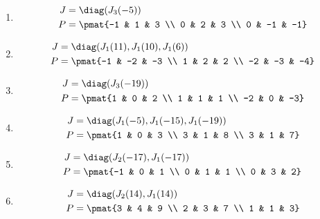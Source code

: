 \begin{enumerate}
\item

\begin{align*}
J &= \diag(J_{3}(-5))\\
P &= \pmat{-1 & 1 & 3 \\ 0 & 2 & 3 \\ 0 & -1 & -1}
\end{align*}

\item

\begin{align*}
J &= \diag(J_{1}(11), J_{1}(10), J_{1}(6))\\
P &= \pmat{-1 & -2 & -3 \\ 1 & 2 & 2 \\ -2 & -3 & -4}
\end{align*}

\item

\begin{align*}
J &= \diag(J_{3}(-19))\\
P &= \pmat{1 & 0 & 2 \\ 1 & 1 & 1 \\ -2 & 0 & -3}
\end{align*}

\item

\begin{align*}
J &= \diag(J_{1}(-5), J_{1}(-15), J_{1}(-19))\\
P &= \pmat{1 & 0 & 3 \\ 3 & 1 & 8 \\ 3 & 1 & 7}
\end{align*}

\item

\begin{align*}
J &= \diag(J_{2}(-17), J_{1}(-17))\\
P &= \pmat{-1 & 0 & 1 \\ 0 & 1 & 1 \\ 0 & 3 & 2}
\end{align*}

\item

\begin{align*}
J &= \diag(J_{2}(14), J_{1}(14))\\
P &= \pmat{3 & 4 & 9 \\ 2 & 3 & 7 \\ 1 & 1 & 3}
\end{align*}


\end{enumerate}
